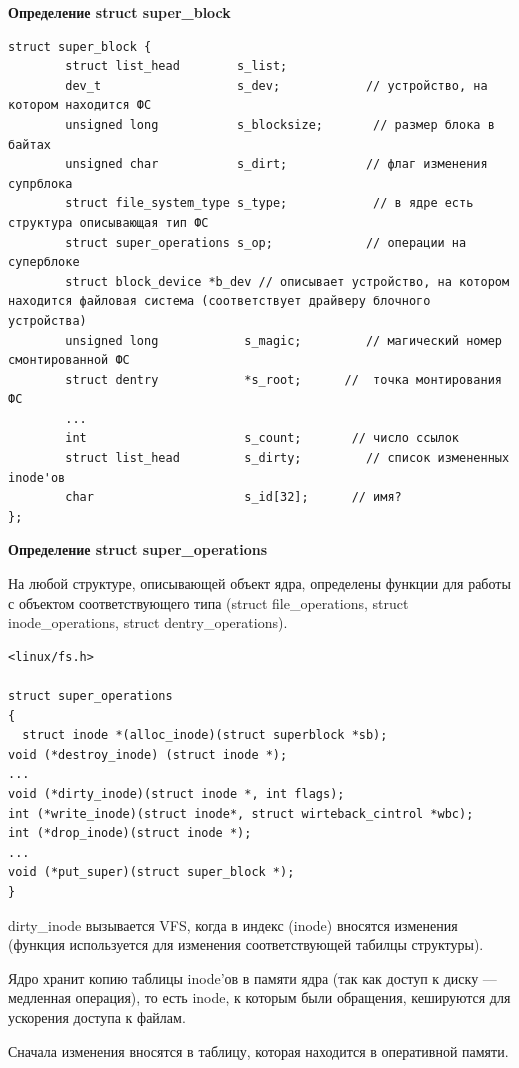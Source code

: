 \textbf{Определение struct super\_block}

\begin{lstlisting}
struct super_block {
        struct list_head        s_list;            
        dev_t                   s_dev;            // устройство, на котором находится ФС
        unsigned long           s_blocksize;       // размер блока в байтах
        unsigned char           s_dirt;           // флаг изменения супрблока
        struct file_system_type s_type;            // в ядре есть структура описывающая тип ФС
        struct super_operations s_op;             // операции на суперблоке
        struct block_device *b_dev // описывает устройство, на котором находится файловая система (соответствует драйверу блочного устройства)
        unsigned long            s_magic;         // магический номер смонтированной ФС
        struct dentry            *s_root;      //  точка монтирования ФС
        ...
        int                      s_count;       // число ссылок
        struct list_head         s_dirty;         // список измененных inode'ов
        char                     s_id[32];      // имя?
};
\end{lstlisting}

\textbf{Определение struct super\_operations}

На любой структуре, описывающей объект ядра, определены функции для работы с объектом соответствующего типа (struct file\_operations, struct \\ inode\_operations, struct dentry\_operations).

\begin{lstlisting}
<linux/fs.h>

struct super_operations
{
  struct inode *(alloc_inode)(struct superblock *sb);
void (*destroy_inode) (struct inode *);
...
void (*dirty_inode)(struct inode *, int flags);
int (*write_inode)(struct inode*, struct wirteback_cintrol *wbc);
int (*drop_inode)(struct inode *);
...
void (*put_super)(struct super_block *);
}

\end{lstlisting}


dirty\_inode вызывается VFS, когда в индекс (inode) вносятся изменения (функция используется для изменения соответствующей табилцы структуры).

Ядро хранит копию таблицы inode'ов в памяти ядра (так как доступ к диску — медленная операция), то есть inode, к которым были обращения, кешируются для ускорения доступа к файлам.

Сначала изменения вносятся в таблицу, которая находится в оперативной памяти.

